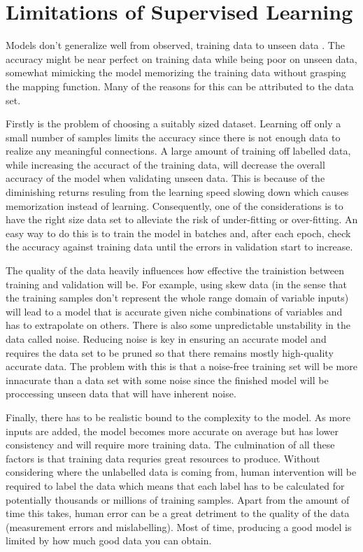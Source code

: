 \documentclass[10pt,a4paper]{report}
\begin{document}
		\section{Limitations of Supervised Learning}
			Models don't generalize well from observed, training data to unseen data \autocite[p. 1-3]{OverfittingSupervisedLearning}. The accuracy might be near perfect
			on training data while being poor on unseen data, somewhat mimicking the model memorizing the training data without grasping the mapping function. 	Many of the reasons for this can be attributed to the data set. \par
			Firstly is the problem of choosing a suitably sized dataset. Learning off only a small number of samples limits the accuracy since there is not enough data to realize
			any meaningful connections. A large amount of training off labelled data, while increasing the accuract of the training data, will decrease the overall
			accuracy of the model when validating unseen data. This is because of the diminishing returns resuling from the learning speed slowing down which causes
			memorization instead of learning. Consequently, one of the considerations is to have the right size data set to alleviate the risk of under-fitting or over-fitting. An easy way
			to do this is to train the model in batches and, after each epoch, check the accuracy against training data until the errors in validation start to increase. \par
			The quality of the data heavily influences how effective the trainistion between training and validation will be. For example, using skew data (in the sense that
			the training samples don't represent the whole range domain of variable inputs) will lead to a model that is accurate given niche combinations of variables and has to
			extrapolate on others. There is also some unpredictable unstability in the data called noise. Reducing noise is key in ensuring an accurate model and requires
			the data set to be pruned so that there remains mostly high-quality accurate data. The problem with this is that a noise-free training set will be more innacurate than a
			data set with some noise since the finished model will be proccessing unseen data that will have inherent noise. \par
			Finally, there has to be realistic bound to the complexity to the model. As more inputs are added, the model becomes more accurate on average but has lower consistency and
			will require more training data. The culmination of all these factors is that training data requries great resources to produce. Without considering where the unlabelled data is coming from,
			human intervention will be required to label the data which means that each label has to be calculated for potentially thousands or millions of training samples.
			Apart from the amount of time this takes, human error can be a great detriment to the quality of the data (measurement errors and mislabelling). Most of time, producing a good
			model is limited by how much good data you can obtain.
\end{document}

